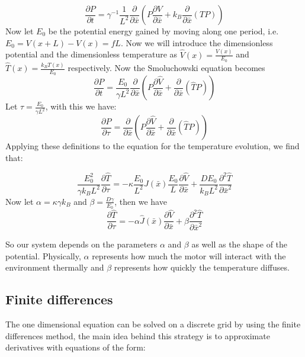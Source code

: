 \begin{equation}
\frac{\partial P}{\partial t} = \gamma^{-1}\frac{1}{L^2} \frac{\partial}{\partial \bar{x}} \left (P \frac{\partial V}{\partial \bar{x}} + k_B \frac{\partial}{\partial \bar{x}}(TP) \right )
\end{equation}
Now let $E_0$ be the potential energy gained by moving along one period, i.e. $E_0 = V(x + L) - V(x) = f L$. Now we will introduce the dimensionless potential and the dimensionless temperature as $\hat{V}(x) = \frac{V(x)}{E_0}$ and $\hat{T}(x) = \frac{k_B T(x)}{E_0}$ respectively. Now the Smoluchowski equation becomes
\begin{equation}
\frac{\partial P}{\partial t} = \frac{E_0}{\gamma L^2} \frac{\partial}{\partial \bar{x}} \left (P \frac{\partial \hat{V}}{\partial \bar{x}} + \frac{\partial}{\partial \bar{x}}(\hat{T}P) \right )
\end{equation}
Let $\tau = \frac{E_0}{\gamma L^2}$, with this we have:
\begin{equation}
\frac{\partial P}{\partial \tau} = \frac{\partial}{\partial \bar{x}} \left (P \frac{\partial \hat{V}}{\partial \bar{x}} + \frac{\partial}{\partial \bar{x}}(\hat{T}P) \right )
\end{equation}
Applying these definitions to the equation for the temperature evolution, we find that:

\begin{equation}
\frac{E_0^2}{\gamma k_B L^2} \frac{\partial \hat{T}}{\partial \tau} = -\kappa \frac{E_0}{L^2}\hat{J}(\bar{x}) \frac{E_0}{L} \frac{\partial \hat{V}}{\partial \bar{x}} + \frac{D E_0}{k_B L^2} \frac{\partial^2 \hat{T}}{\partial \bar{x}^2}
\end{equation}
Now let $\alpha = \kappa \gamma k_B$ and $\beta = \frac{D \gamma}{E_0}$, then we have
\begin{equation}
\frac{\partial \hat{T}}{\partial \tau} = -\alpha \hat{J}(\bar{x}) \frac{\partial \hat{V}}{\partial \bar{x}} + \beta \frac{\partial^2 \hat{T}}{\partial \bar{x}^2}
\end{equation}

So our system depends on the parameters $\alpha$ and $\beta$ as well as the shape of the potential. Physically, $\alpha$ represents how much the motor will interact with the environment thermally and $\beta$ represents how quickly the temperature diffuses.

\subsection{Finite differences}
The one dimensional equation can be solved on a discrete grid by using the finite differences method, the main idea behind this strategy is to approximate derivatives with equations of the form:

